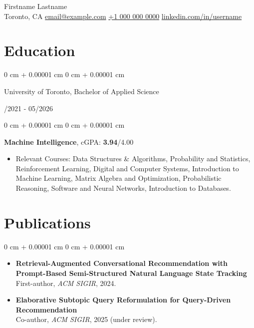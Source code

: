\documentclass[11pt, letterpaper]{article}
\makeatletter
\newenvironment{highlights}{
    \begin{itemize}[
        topsep=0.08 cm,
        parsep=0.08 cm,
        partopsep=0pt,
        itemsep=0pt,
        leftmargin=0.2 cm + 17pt
    ]
}
{
    \end{itemize}
}
\newenvironment{onecolentry}{
    \begin{adjustwidth}{
        0 cm + 0.00001 cm
    }{
        0 cm + 0.00001 cm
    }
}{
    \end{adjustwidth}
}
\newenvironment{twocolentry}[2][]{
    \onecolentry
    \def\secondColumn{#2}
    \setcolumnwidth{\fill, 4.5 cm}
    \begin{paracol}{2}
}{
    \switchcolumn \raggedleft \secondColumn
    \end{paracol}
    \endonecolentry
}
\newcommand{\contactinfo}{
    \centering
    {\fontsize{25pt}{25pt}\selectfont Firstname Lastname} \\[4pt]
    \vspace{0.3cm}
    \small Toronto, CA \hfill 
    \href{mailto:email@example.com}{email@example.com} \hfill 
    \href{tel:+1-000-000-0000}{+1 000 000 0000} \hfill 
    \href{https://www.linkedin.com/in/username}{linkedin.com/in/username} \\
}
\makeatother
\begin{document}
\contactinfo
\vspace{2pt}

\section{Education}
\vspace{0.08 cm}
\begin{twocolentry}{09/2021 - 05/2026}
    {University of Toronto}, Bachelor of Applied Science
\end{twocolentry}
\vspace{0.11cm}
\begin{onecolentry}
\hspace{0.3cm}\textbf{Machine Intelligence},  cGPA: {\textbf{3.94}}/4.00
\vspace{0.07cm}
    \begin{highlights}
        \item Relevant Courses: Data Structures \& Algorithms, Probability and Statistics, Reinforcement Learning, Digital and Computer Systems, Introduction to Machine Learning, Matrix Algebra and Optimization, Probabilistic Reasoning, Software and Neural Networks, Introduction to Databases.
    \end{highlights}
\end{onecolentry}

\section{Publications}
\vspace{0.08 cm}
\begin{onecolentry}
    \begin{highlights}
    \item \textbf{Retrieval-Augmented Conversational Recommendation with Prompt-Based Semi-Structured Natural Language State Tracking} \\
    First-author, \textit{ACM SIGIR}, 2024. 
    \vspace{0.1cm}
    \item \textbf{Elaborative Subtopic Query Reformulation for Query-Driven Recommendation} \\
    Co-author, \textit{ACM SIGIR}, 2025 (under review).
    \end{highlights}
\end{onecolentry}
\end{document}
